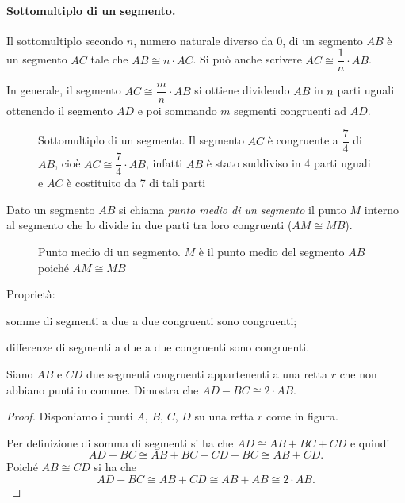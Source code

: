 \paragraph{Sottomultiplo di un segmento.} Il sottomultiplo secondo $n$, numero naturale diverso da 0, di un segmento $AB$ è un segmento $AC$ tale che $AB\cong n\cdot AC$. Si può anche scrivere $AC \cong \dfrac{1}{n}\cdot AB$.

In generale, il segmento $AC\cong\dfrac{m}{n}\cdot AB$ si ottiene dividendo $AB$ in $n$ parti uguali ottenendo il segmento $AD$ e poi sommando $m$ segmenti congruenti ad $AD$.

\begin{figure}[htb]
\centering
\caption{Sottomultiplo di un segmento. Il segmento $AC$ è congruente a $\dfrac{7}{4}$ di $AB$, cioè $AC\cong\dfrac{7}{4}\cdot AB$, infatti $AB$ è stato suddiviso in 4 parti uguali e $AC$ è costituito da 7 di tali parti}
\end{figure}

\begin{definizione}
Dato un segmento $AB$ si chiama \emph{punto medio di un segmento} il punto $M$ interno al segmento che lo divide in due parti tra loro congruenti ($AM\cong MB$).
\end{definizione}

\begin{figure}[htb]
\centering
\caption{Punto medio di un segmento. $M$ è il punto medio del segmento $AB$ poiché $AM\cong MB$}
\end{figure}

Proprietà:
\begin{itemize*}
\item somme di segmenti a due a due congruenti sono congruenti; 
\item differenze di segmenti a due a due congruenti sono congruenti.
\end{itemize*}

\begin{exrig}
\begin{esempio}
Siano $AB$ e $CD$ due segmenti congruenti appartenenti a una retta $r$ che non abbiano punti in comune. Dimostra che $AD-BC\cong 2\cdot AB$.
\begin{proof}
Disponiamo i punti $A$, $B$, $C$, $D$ su una retta $r$ come in figura.
\begin{figure}[htb]
\centering
\end{figure}

Per definizione di somma di segmenti si ha che $AD\cong AB+BC+CD$ e quindi
\[AD-BC\cong AB+BC+CD-BC\cong AB+CD.\]
Poiché $AB\cong CD$ si ha che
\[AD-BC\cong AB+CD\cong AB+AB\cong 2\cdot AB.\]
\end{proof}
\end{esempio}
\end{exrig}

